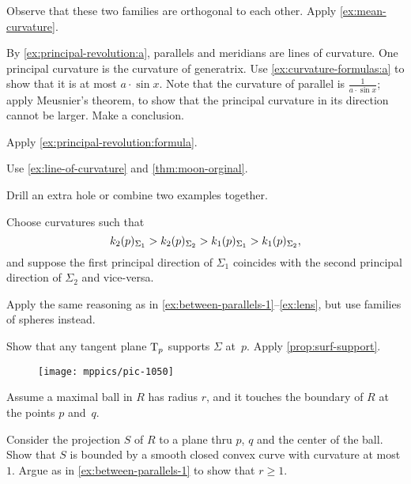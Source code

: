 \begin{multicols}{2}
Observe that these two families are orthogonal to each other.
Apply \ref{ex:mean-curvature}.

By \ref{ex:principal-revolution:a}, parallels and meridians are lines of curvature.
One principal curvature is the curvature of generatrix.
Use \ref{ex:curvature-formulas:a} to show that it is at most $a\cdot \sin x$.
Note that the curvature of parallel is $\tfrac1{a\cdot \sin x}$;
apply Meusnier's theorem, to show that the principal curvature in its direction cannot be larger.
Make a conclusion.

 Apply \ref{ex:principal-revolution:formula}.

Use \ref{ex:line-of-curvature} and \ref{thm:moon-orginal}.

 Drill an extra hole or combine two examples together.



\setcounter{eqtn}{0}

Choose curvatures such that 
\[k_2(p)_{\Sigma_1}\z>k_2(p)_{\Sigma_2}> k_1(p)_{\Sigma_1}> k_1(p)_{\Sigma_2},\]
and suppose the first principal direction of $\Sigma_1$ coincides with the second principal direction of $\Sigma_2$ and vice-versa.

Apply the same reasoning as in \ref{ex:between-parallels-1}--\ref{ex:lens}, but use families of spheres instead.

Show that any tangent plane $\mathrm{T}_p$ supports $\Sigma$ at~$p$.
Apply \ref{prop:surf-support}.

{

\begin{wrapfigure}{r}{16 mm}
\vskip-0mm
\centering
\texttt{[image: mppics/pic-1050]}
\vskip-0mm
\end{wrapfigure}

Assume a maximal ball in $R$ has radius $r$, and it touches the boundary of $R$ at the points $p$ and~$q$.

Consider the projection $S$ of $R$ to a plane thru $p$, $q$ and the center of the ball.
Show that $S$ is bounded by a smooth closed convex curve with curvature at most $1$.
Argue as in \ref{ex:between-parallels-1} to
show that $r\ge 1$.

}
\end{multicols}
